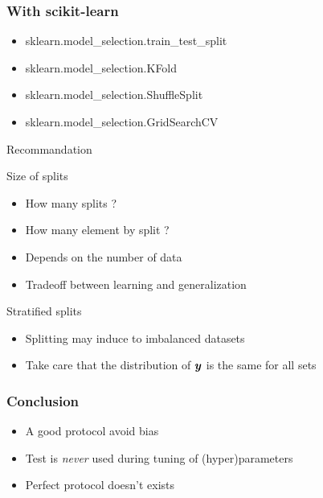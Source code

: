 \documentclass[11pt, pdf, compress, handout]{beamer}
\begin{document}
\begin{frame}
  \frametitle{With scikit-learn}
  \begin{itemize}
    \item \textrm{sklearn.model\_selection.train\_test\_split}
    \item \textrm{sklearn.model\_selection.KFold}
    \item \textrm{sklearn.model\_selection.ShuffleSplit}
    \item \textrm{sklearn.model\_selection.GridSearchCV}
  \end{itemize}
\end{frame}

\begin{frame}{Recommandation}
  \begin{block}{Size of splits}
    \begin{itemize}
    \item How many splits ? 
    \item How many element by split ?
    \item Depends on the number of data
    \item Tradeoff between learning and generalization
    \end{itemize}
  \end{block}
  \begin{block}{Stratified splits}
    \begin{itemize}
    \item Splitting may induce to imbalanced datasets
    \item Take care that the distribution of ${\boldsymbol{y}}$ is the same for all sets
    \end{itemize}
  \end{block}
  
\end{frame}
\begin{frame}
  \frametitle{Conclusion}
  \begin{itemize}
  \item A good protocol avoid bias
  \item Test is \emph{never} used during tuning of (hyper)parameters
  \item Perfect protocol doesn't exists
  \end{itemize}
\end{frame}
\end{document}

